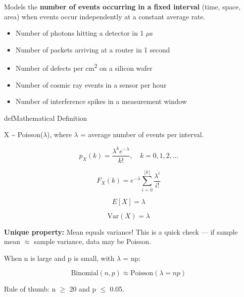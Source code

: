 

Models the \textbf{number of events occurring in a fixed interval} (time, space, area) when events occur independently at a constant average rate.


\begin{itemize}
\tightlist
\item
  Number of photons hitting a detector in 1 \ensuremath{\mu}s
\item
  Number of packets arriving at a router in 1 second
\item
  Number of defects per cm\textsuperscript{2} on a silicon wafer
\item
  Number of cosmic ray events in a sensor per hour
\item
  Number of interference spikes in a measurement window
\end{itemize}

\begin{PSbox}[unbreakable]{def}{Mathematical Definition}

X \textasciitilde{} Poisson(\ensuremath{\lambda}), where \ensuremath{\lambda} = average number of events per interval.

\end{PSbox}


\[p_X(k) = \frac{\lambda^k e^{-\lambda}}{k!}, \quad k = 0, 1, 2, \ldots\]


\[F_X(k) = e^{-\lambda} \sum_{i=0}^{\lfloor k \rfloor} \frac{\lambda^i}{i!}\]


\[E[X] = \lambda\]


\[\text{Var}(X) = \lambda\]

\textbf{Unique property:} Mean equals variance! This is a quick check — if sample mean \ensuremath{\approx} sample variance, data may be Poisson.


When n is large and p is small, with \ensuremath{\lambda} = np:

\[\text{Binomial}(n, p) \approx \text{Poisson}(\lambda = np)\]

Rule of thumb: n \ensuremath{\ge} 20 and p \ensuremath{\le} 0.05.

